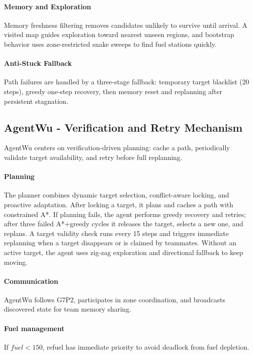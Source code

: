\documentclass{article}
\begin{document}
\paragraph{Memory and Exploration}
Memory freshness filtering removes candidates unlikely to survive until arrival.
A visited map guides exploration toward nearest unseen regions, and bootstrap behavior uses zone-restricted snake sweeps to find fuel stations quickly.

\paragraph{Anti-Stuck Fallback}
Path failures are handled by a three-stage fallback:
temporary target blacklist (20 steps), greedy one-step recovery, then memory reset and replanning after persistent stagnation.

\subsection{AgentWu - Verification and Retry Mechanism}
AgentWu centers on verification-driven planning: cache a path, periodically validate target availability, and retry before full replanning.

\paragraph{Planning} 
The planner combines dynamic target selection, conflict-aware locking, and proactive adaptation.
After locking a target, it plans and caches a path with constrained A*.
If planning fails, the agent performs greedy recovery and retries; after three failed A*+greedy cycles it releases the target, selects a new one, and replans.
A target validity check runs every 15 steps and triggers immediate replanning when a target disappears or is claimed by teammates.
Without an active target, the agent uses zig-zag exploration and directional fallback to keep moving.

\paragraph{Communication} AgentWu follows G7P2, participates in zone coordination, and broadcasts discovered state for team memory sharing.

\paragraph{Fuel management} If \(fuel<150\), refuel has immediate priority to avoid deadlock from fuel depletion.
\end{document}
